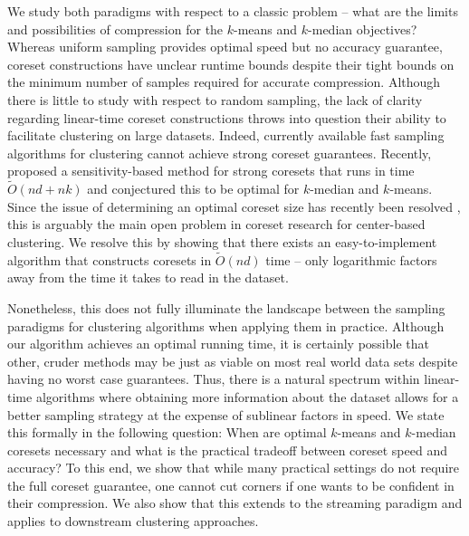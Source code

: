 We study both paradigms with respect to a classic problem -- what are the limits and possibilities of compression for the $k$-means and $k$-median objectives?
Whereas uniform sampling provides optimal speed but no accuracy guarantee, coreset constructions have unclear runtime bounds despite their tight bounds on the
minimum number of samples required for accurate compression. Although there is little to study with respect to random sampling, the lack of clarity regarding
linear-time coreset constructions throws into question their ability to facilitate clustering on large datasets. Indeed, currently available fast sampling
algorithms for clustering \cite{BachemL018} \cite{kmeans_sublinear_bachem16} cannot achieve strong coreset guarantees.  Recently, \cite{DSWY22} proposed
a sensitivity-based method for strong coresets that runs in time $\tilde{O}(nd + nk)$ and conjectured this to be optimal for $k$-median and $k$-means.  Since
the issue of determining an optimal coreset size has recently been resolved \cite{CSS21,CLSSS22,HLW23}, this is arguably the main open problem in coreset
research for center-based clustering. We resolve this by showing that there exists an easy-to-implement algorithm that constructs coresets in $\tilde{O}(nd)$
time -- only logarithmic factors away from the time it takes to read in the dataset.

Nonetheless, this does not fully illuminate the landscape between the sampling paradigms for clustering algorithms when applying them in practice. Although our
algorithm achieves an optimal running time, it is certainly possible that other, cruder methods may be just as viable on most real world data sets despite
having no worst case guarantees.  Thus, there is a natural spectrum within linear-time algorithms where obtaining more information about the dataset allows for
a better sampling strategy at the expense of sublinear factors in speed. We state this formally in the following question: When are optimal $k$-means and
$k$-median coresets necessary and what is the practical tradeoff between coreset speed and accuracy? To this end, we show that while many practical settings do
not require the full coreset guarantee, one cannot cut corners if one wants to be confident in their compression. We also show that this extends to the
streaming paradigm and applies to downstream clustering approaches.

